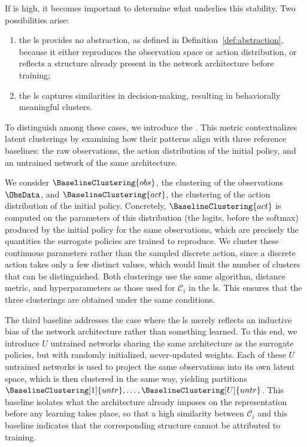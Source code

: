 If \ClusteringUniversalityName is high, it becomes important to determine what underlies this stability.
Two possibilities arise:
\begin{enumerate}[label=(\roman*), ref=(\roman*)]
\item \label{i} the \gls{ls} provides no abstraction, as defined in Definition~\ref{def:abstraction}, because it either reproduces the observation space or action distribution, or reflects a structure already present in the network architecture before training;
\item \label{ii} the \gls{ls} captures similarities in decision-making, resulting in behaviorally meaningful clusters.
\end{enumerate}


To distinguish among these cases, we introduce the \AbstractionScoreName.
This metric contextualizes latent clusterings by examining how their patterns align with three reference baselines: the raw observations, the action distribution of the initial policy, and an untrained network of the same architecture.

We consider $\BaselineClustering{obs}$, the clustering of the observations $\ObsData$, and $\BaselineClustering{act}$, the clustering of the action distribution of the initial policy.
Concretely, $\BaselineClustering{act}$ is computed on the parameters of this distribution (the logits, before the softmax) produced by the initial policy for the same observations, which are precisely the quantities the surrogate policies are trained to reproduce.
We cluster these continuous parameters rather than the sampled discrete action, since a discrete action takes only a few distinct values, which would limit the number of clusters that can be distinguished.
Both clusterings use the same algorithm, distance metric, and hyperparameters as those used for $\mathcal{C}_{i}$ in the \gls{ls}.
This ensures that the three clusterings are obtained under the same conditions.

The third baseline addresses the case where the \gls{ls} merely reflects an inductive bias of the network architecture rather than something learned.
To this end, we introduce $U$ untrained networks sharing the same architecture as the surrogate policies, but with randomly initialized, never-updated weights.
Each of these $U$ untrained networks is used to project the same observations into its own latent space, which is then clustered in the same way, yielding partitions $\BaselineClustering[1]{untr}, \dots, \BaselineClustering[U]{untr}$.
This baseline isolates what the architecture already imposes on the representation before any learning takes place, so that a high similarity between $\mathcal{C}_i$ and this baseline indicates that the corresponding structure cannot be attributed to training.

